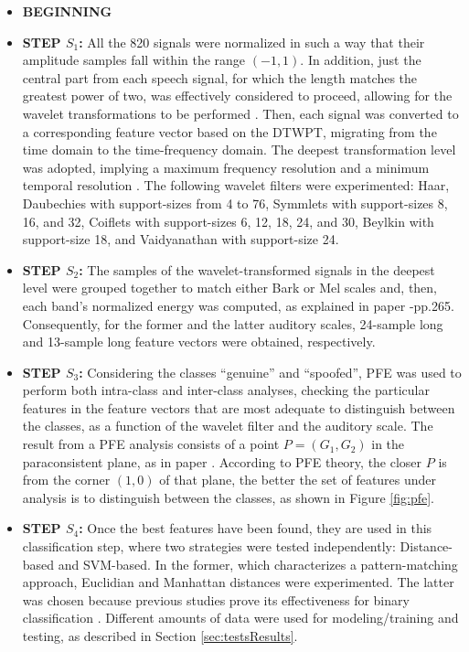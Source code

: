 \begin{itemize}
\item{}\textbf{BEGINNING}
\item{}\textbf{STEP $S_1$: }All the 820 signals were normalized in such a way that their amplitude samples fall within the range $(-1,1)$. In addition, just the central part from each speech signal, for which the length matches the greatest power of two, was effectively considered to proceed, allowing for the wavelet transformations to be performed \cite{guidodwt1}. Then, each signal was converted to a corresponding feature vector based on the DTWPT, migrating from the time domain to the time-frequency domain. The deepest transformation level was adopted, implying a maximum frequency resolution and a minimum temporal resolution \cite{guidodwt1}. The following wavelet filters were experimented: Haar, Daubechies with support-sizes from 4 to 76, Symmlets with support-sizes 8, 16, and 32, Coiflets with support-sizes 6, 12, 18, 24, and 30, Beylkin with support-size 18, and Vaidyanathan with support-size 24. 
\item{}\textbf{STEP $S_2$: }The samples of the wavelet-transformed signals in the deepest level were grouped together to match either Bark \cite{bossi} or Mel scales \cite{bossi2} and, then, each band's normalized energy was computed, as explained in paper \cite{tut_se}-pp.265. Consequently, for the former and the latter auditory scales, 24-sample long and 13-sample long feature vectors were obtained, respectively.  
\item{}\textbf{STEP $S_3$: }Considering the classes ``genuine'' and ``spoofed'', PFE was used to perform both intra-class and inter-class analyses, checking the particular features in the feature vectors that are most adequate to distinguish between the classes, as a function of the wavelet filter and the auditory scale. The result from a PFE analysis consists of a point $P=(G_1,G_2)$ in the paraconsistent plane, as in paper \cite{8588433}. According to PFE theory, the closer $P$ is from the corner $(1,0)$ of that plane, the better the set of features under analysis is to distinguish between the classes, as shown in Figure \ref{fig:pfe}. 
\item{}\textbf{STEP $S_4$: }Once the best features have been found, they are used in this classification step, where two strategies were tested independently: Distance-based and SVM-based. In the former, which characterizes a pattern-matching approach, Euclidian and Manhattan distances were experimented. The latter was chosen because previous studies prove its effectiveness for binary classification \cite{bennett2000support}. Different amounts of data were used for modeling/training and testing, as described in Section \ref{sec:testsResults}.

\end{itemize}
